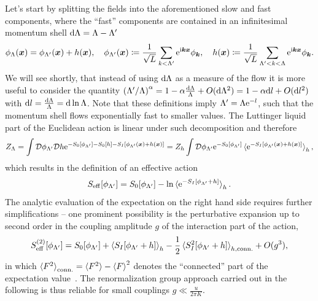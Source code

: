Let's start by splitting the fields into the aforementioned slow and fast components, where the ``fast'' components are contained in an infinitesimal momentum shell $\mathrm d\Lambda=\Lambda-\Lambda'$
\begin{align}
    \phi_\Lambda({\bm x}) = \phi_{\Lambda'}({\bm x}) + h({\bm x}),
    \quad
    \phi_{\Lambda'}({\bm x})\coloneqq\frac1{\sqrt L}\sum_{k<\Lambda'}\mathrm e^{\mathrm i {\bm k}{\bm x}}\phi_{\bm k},
    \quad
    h({\bm x}) \coloneqq \frac1{\sqrt L}\sum_{\Lambda'<k<\Lambda}\mathrm e^{\mathrm i {\bm k}{\bm x}}\phi_{\bm k}.
\end{align}
We will see shortly, that instead of using $\mathrm d\Lambda$ as a measure of the flow it is more useful to consider the quantity $\left( \Lambda'/\Lambda \right)^\alpha=1-\alpha\frac{\mathrm d\Lambda}\Lambda + O(\mathrm d\Lambda^2) = 1-\alpha\mathrm d l + O(\mathrm d l^2)$ with $\mathrm d l =\frac{\mathrm d\Lambda}\Lambda = \mathrm d\ln\Lambda$.
Note that these definitions imply $\Lambda'=\Lambda\mathrm e^{-l}$, such that the momentum shell flows exponentially fast to smaller values.
The Luttinger liquid part of the Euclidean action is linear under such decomposition and therefore
\begin{align}
    Z_\Lambda
    = \int\mathcal D\phi_{\Lambda'}\mathcal D h \mathrm e^{-S_0[\phi_{\Lambda'}]-S_0[h]-S_I[\phi_{\Lambda'}({\bm x}) + h({\bm x})]}
    = Z_h\int\mathcal D\phi_{\Lambda'}\mathrm e^{-S_0[\phi_{\Lambda'}]}\braket{\mathrm e^{-S_I[\phi_{\Lambda'}({\bm x}) + h({\bm x})]}}_h,
\end{align}
which results in the definition of an effective action
\begin{align}
    S_{\rm eff}[\phi_{\Lambda'}] = S_0[\phi_{\Lambda'}] - \ln\braket{\mathrm e^{-S_I[\phi_{\Lambda'}+h]}}_h.
\end{align}
The analytic evaluation of the expectation on the right hand side requires further simplifications -- one prominent possibility is the perturbative expansion up to second order in the coupling amplitude $g$ of the interaction part of the action,
\begin{align}
    S^{(2)}_{\rm eff}[\phi_{\Lambda'}] = S_0[\phi_{\Lambda'}] + \braket{S_I[\phi_{\Lambda'}+h]}_h - \frac12\braket{S^2_I[\phi_{\Lambda'}+h]}_{h,{\rm conn.}} + O(g^3),
\end{align}
in which $\braket{F^2}_{\rm conn.} = \braket{F^2}-\braket{F}^2$ denotes the ``connected'' part of the expectation value~\cite{Gogolin2004}.
The renormalization group approach carried out in the following is thus reliable for small couplings $g\ll \frac u{2\pi K}$.

